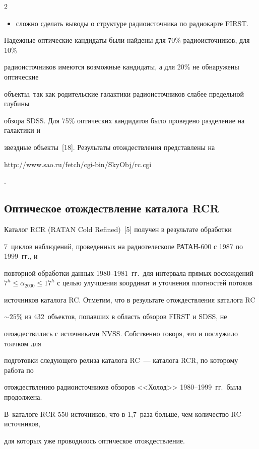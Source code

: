 \begin{multicols}{2}
\begin{itemize}
\item сложно сделать выводы о структуре радиоисточника по радиокарте FIRST.

\end{itemize}



Надежные оптические кандидаты были найде\-ны для 70\% радиоисточников, для 10\% 

радиоисточников имеются возможные кандидаты, а для 20\% не обнаружены оптические 

объекты, так как родительские галактики радиоисточников слабее предельной глубины 

обзора SDSS. Для 75\% оптических кандидатов было проведено разделение на галактики и 

звездные объекты~[18]. Результаты отождествления представлены на {\sf 

http://www.sao.ru/fetch/cgi-bin/SkyObj/rc.cgi}.



\subsection{Оптическое отождествление каталога RCR}

      

      Каталог RCR (RATAN Cold Refined)~[5] получен в результате обработки 

7~циклов наблюдений, проведенных на радиотелескопе РАТАН-600 с 1987 по 1999~гг., и 

повторной обработки данных 1980--1981~гг.\ для интервала прямых восхождений $7^h \leq 

\alpha_{2000}\leq 17^h$ с целью улучшения координат и уточнения плотностей потоков 

источников каталога RC. Отметим, что в результате отождествления каталога RC 

$\sim25\%$ из 432~объектов, попавших в область обзоров FIRST и SDSS, не 

отождествились с источниками NVSS. Собственно говоря, это и послужило толчком для 

подготовки следующего релиза каталога RC~--- каталога RCR, по которому работа по 

отождествлению радиоисточников обзоров <<Холод>> 1980--1999~гг.\ была продолжена. 

В~каталоге RCR 550 источников, что в 1,7~раза больше, чем количество RC-ис\-точ\-ни\-ков, 

для которых уже проводилось оптическое отождествление.


\end{multicols}
